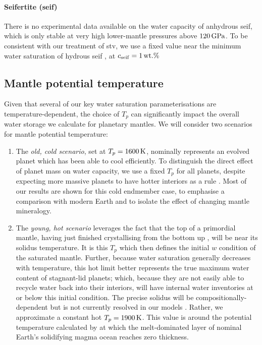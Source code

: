 \paragraph{Seifertite (seif)}

There is no experimental data available on the water capacity of anhydrous seif, which is only stable at very high lower-mantle pressures above $120\,{\rm GPa}$. To be consistent with our treatment of stv, we use a fixed value near the minimum water saturation of hydrous seif \citep{lin_hydrous_2022}, at $c_{\rm seif} = 1\,{\rm wt.\%}$










\subsection{Mantle potential temperature}\label{sec:methods_temperature}

Given that several of our key water saturation parameterisations are temperature-dependent, the choice of $T_p$ can significantly impact the overall water storage we calculate for planetary mantles. We will consider two scenarios for mantle potential temperature:

\begin{enumerate} 
\item The \textit{old, cold scenario}, set at $T_p = 1600\,{\rm K}$, nominally represents an evolved planet which has been able to cool efficiently. To distinguish the direct effect of planet mass on water capacity, we use a fixed $T_p$ for all planets, despite expecting more massive planets to have hotter interiors as a rule \citep[e.g.,][]{valencia_internal_2006}. Most of our results are shown for this cold endmember case, to emphasise a comparison with modern Earth and to isolate the effect of changing mantle mineralogy.

\item The \textit{young, hot scenario} leverages the fact that the top of a primordial mantle, having just finished crystallising from the bottom up \citep{elkins-tanton_linked_2008}, will be near its solidus temperature. It is this $T_p$ which then defines the initial $w$ condition of the saturated mantle. Further, because water saturation generally decreases with temperature, this hot limit better represents the true maximum water content of stagnant-lid planets; which, because they are not easily able to recycle water back into their interiors, will have internal water inventories at or below this initial condition. The precise solidus will be compositionally-dependent but is not currently resolved in our models \citep[see also section \ref{sec:discussion-temperature}]{hirschmann_mantle_2000}. Rather, we approximate a constant hot $T_p = 1900\,{\rm K}$. This value is around the potential temperature calculated by \citet{miyazaki_wet_2022} at which the melt-dominated layer of nominal Earth's solidifying magma ocean reaches zero thickness. 

\end{enumerate}


